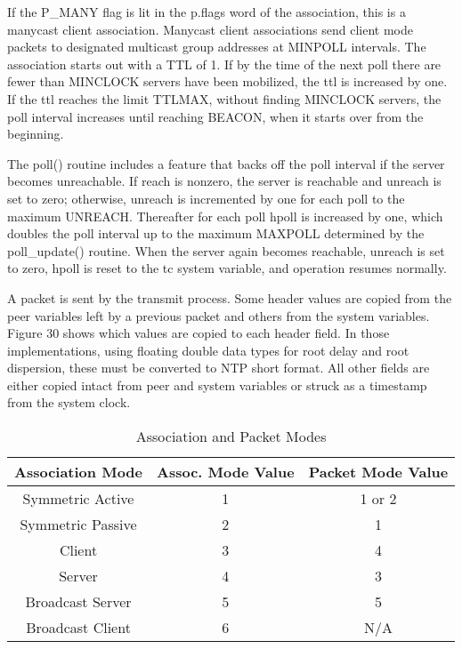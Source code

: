 If the P\_MANY flag is lit in the p.flags word of the association,
this is a manycast client association.  Manycast client associations
send client mode packets to designated multicast group addresses at
MINPOLL intervals.  The association starts out with a TTL of 1.  If
by the time of the next poll there are fewer than MINCLOCK servers
have been mobilized, the ttl is increased by one.  If the ttl reaches
the limit TTLMAX, without finding MINCLOCK servers, the poll interval
increases until reaching BEACON, when it starts over from the
beginning.

The poll() routine includes a feature that backs off the poll
interval if the server becomes unreachable.  If reach is nonzero, the
server is reachable and unreach is set to zero; otherwise, unreach is
incremented by one for each poll to the maximum UNREACH.  Thereafter
for each poll hpoll is increased by one, which doubles the poll
interval up to the maximum MAXPOLL determined by the poll\_update()
routine.  When the server again becomes reachable, unreach is set to
zero, hpoll is reset to the tc system variable, and operation resumes
normally.

A packet is sent by the transmit process.  Some header values are
copied from the peer variables left by a previous packet and others
from the system variables.  Figure 30 shows which values are copied
to each header field.  In those implementations, using floating
double data types for root delay and root dispersion, these must be
converted to NTP short format.  All other fields are either copied
intact from peer and system variables or struck as a timestamp from
the system clock.

\begin{table}[htb]
\center
\begin{tabular}{c | c | c}
Association Mode & Assoc. Mode Value & Packet Mode Value \\
\hline
\hline
Symmetric Active & 1 & 1 or 2 \\
Symmetric Passive & 2 & 1 \\
Client & 3 & 4 \\
Server & 4 & 3 \\
Broadcast Server & 5 & 5 \\
Broadcast Client & 6 & N/A \\
\hline
\end{tabular}
\label{association_and_packet_modes}
\caption{Association and Packet Modes}
\end{table}

